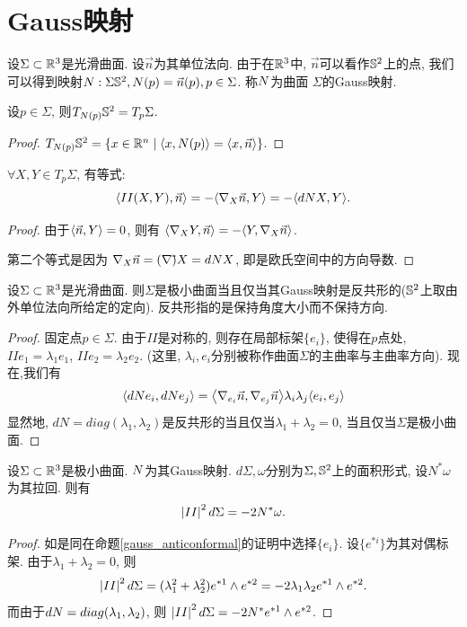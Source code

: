 \section{Gauss映射}
设$\Sigma \subset \R^3$是光滑曲面. 设$\vec{n}$为其单位法向. 由于在$\R^3$中, $\vec{n}$可以看作$\S^2$上的点, 我们可以得到映射$\N:\Sigma \S^2, \N(p)=\vec{n}(p), p \in \Sigma$. 称$\N$为曲面 $\Sigma$的Gauss映射.
\begin{proposition}
    设$p \in \Sigma$, 则$T_{\N(p)}\S^2= T_p\Sigma$.
\end{proposition}
\begin{proof}
    $T_{\N(p)}\S^2=\{x\in \R^n\mid \inner{x}{\N(p)}=\inner{x}{\vec{n}}\}$.
\end{proof}
\begin{proposition}
    $\forall X, Y \in T_p\Sigma$, 有等式: 
    \begin{equation}
        \inner{II(X,Y)}{\vec{n}}=-\inner{\nabla_X\vec{n}}{Y}=-\inner{d\N X}{Y}.
    \end{equation}
\end{proposition}
\begin{proof}
    由于$\inner{\vec{n}}{Y}=0$, 则有 $\inner{\nabla_XY}{\vec{n}}=-\inner{Y}{\nabla_X\vec{n}}$. 
    \par 第二个等式是因为 $\nabla_X\vec{n}=(\nabla \vec{})X=d\N X$, 即是欧氏空间中的方向导数.
\end{proof}
\begin{proposition} \label{gauss_anticonformal}
    设$\Sigma \subset \R^3$是光滑曲面. 则$\Sigma$是极小曲面当且仅当其Gauss映射是反共形的($\S^2$上取由外单位法向所给定的定向). 反共形指的是保持角度大小而不保持方向.
\end{proposition}
\begin{proof}
    固定点$p \in \Sigma$. 由于$II$是对称的, 则存在局部标架$\{e_i\}$, 使得在$p$点处, $II e_1=\lambda_1 e_1$, $II e_2=\lambda_2 e_2$. (这里, $\lambda_i,e_i$分别被称作曲面$\Sigma$的主曲率与主曲率方向). 现在,我们有
    \begin{equation}
        \inner{d\N e_i}{d\N e_j}= \inner{\nabla_{e_i}\vec{n}}{\nabla_{e_j}\vec{n}} \lambda_i\lambda_j\inner{e_i}{e_j}
    \end{equation}
    显然地,  $dN=diag(\lambda_1,\lambda_2)$是反共形的当且仅当$\lambda_1+\lambda_2=0$, 当且仅当$\Sigma$是极小曲面.
\end{proof}
\begin{proposition}
    设$\Sigma \subset \R^3$是极小曲面. $\N$为其Gauss映射. $d\Sigma, \omega$分别为$\Sigma, \S^2$上的面积形式, 设$N^*\omega$为其拉回. 则有
    \begin{equation}
        \abs{II}^2d\Sigma= -2N^*\omega.
    \end{equation}
\end{proposition}
\begin{proof}
    如是同在命题\eqref{gauss_anticonformal}的证明中选择$\{e_i\}$. 设$\{e^{*i}\}$为其对偶标架. 由于$\lambda_1+\lambda_2=0$, 则
    \begin{equation}
        \abs{II}^2d\Sigma=(\lambda_1^2+\lambda_2^2)e^{*1}\wedge e^{*2}=-2\lambda_1\lambda_2 e^{*1}\wedge e^{*2}.
    \end{equation}
    而由于$d\N=diag(\lambda_1,\lambda_2)$, 则 $\abs{II}^2d\Sigma=-2N^* e^{*1} \wedge e^{*2}$.
\end{proof}

